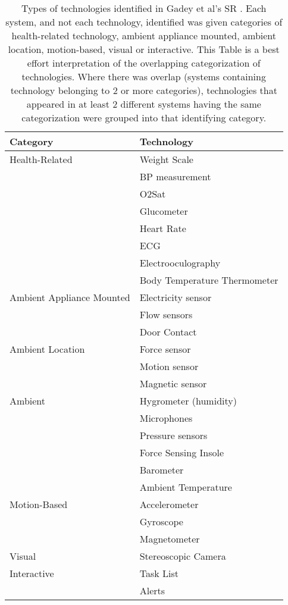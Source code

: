 \begin{table}[!ht]
    \centering
    \scriptsize
    \caption{Types of technologies identified in Gadey et al's SR \cite{gadey_technologies_2023}. Each system, and not each technology, identified was given categories of health-related technology, ambient appliance mounted, ambient location, motion-based, visual or interactive. This Table is a best effort interpretation of the overlapping categorization of technologies. Where there was overlap (systems containing technology belonging to 2 or more categories), technologies that appeared in at least 2 different systems having the same categorization were grouped into that identifying category.}
    \label{tab:gadey-tech}
    \begin{tabular}[pos]{ p{} p{} }
        \toprule
        \textbf{Category} & \textbf{Technology} \\
        \midrule
        Health-Related & Weight Scale \\
        & BP measurement \\
        & O2Sat \\
        & Glucometer \\
        & Heart Rate \\
        & ECG \\
        & Electrooculography \\
        & Body Temperature Thermometer \\
        \midrule
        Ambient Appliance Mounted & Electricity sensor \\
        & Flow sensors \\
        & Door Contact \\
        \midrule
        Ambient Location & Force sensor \\
        & Motion sensor \\
        & Magnetic sensor \\
        \midrule
        Ambient & Hygrometer (humidity) \\
        & Microphones \\
        & Pressure sensors \\
        & Force Sensing Insole \\
        & Barometer \\
        & Ambient Temperature \\
        \midrule 
        Motion-Based & Accelerometer \\
        & Gyroscope \\
        & Magnetometer \\
        \midrule
        Visual & Stereoscopic Camera \\
        \midrule
        Interactive & Task List \\
        & Alerts \\
        \bottomrule 
    \end{tabular}
\end{table}

